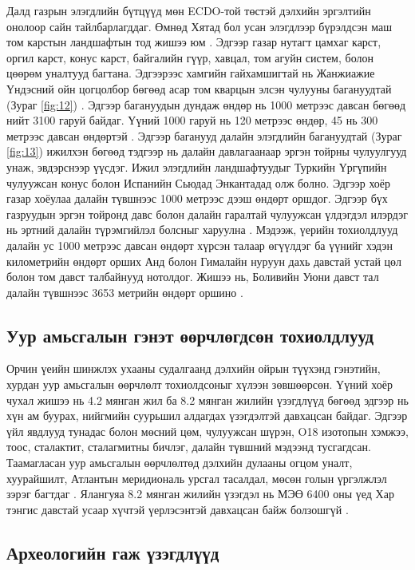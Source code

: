 \documentclass[10pt,twocolumn,letterpaper]{article}
\begin{document}
Далд газрын элэгдлийн бүтцүүд мөн ECDO-той төстэй дэлхийн эргэлтийн онолоор сайн тайлбарлагддаг. Өмнөд Хятад бол усан элэгдлээр бүрэлдсэн маш том карстын ландшафтын тод жишээ юм \cite{82}. Эдгээр газар нутагт цамхаг карст, оргил карст, конус карст, байгалийн гүүр, хавцал, том агуйн систем, болон цөөрөм уналтууд багтана. Эдгээрээс хамгийн гайхамшигтай нь Жанжиажие Үндэсний ойн цогцолбор бөгөөд асар том кварцын элсэн чулууны багануудтай (Зураг \ref{fig:12}) \cite{84}. Эдгээр багануудын дундаж өндөр нь 1000 метрээс давсан бөгөөд нийт 3100 гаруй байдаг. Үүний 1000 гаруй нь 120 метрээс өндөр, 45 нь 300 метрээс давсан өндөртэй \cite{85}. Эдгээр баганууд далайн элэгдлийн багануудтай (Зураг \ref{fig:13}) ижилхэн бөгөөд тэдгээр нь далайн давлагаанаар эргэн тойрны чулуулгууд унаж, эвдэрснээр үүсдэг. Ижил элэгдлийн ландшафтуудыг Туркийн Үргүпийн чулуужсан конус болон Испанийн Сьюдад Энкантадад олж болно. Эдгээр хоёр газар хоёулаа далайн түвшнээс 1000 метрээс дээш өндөрт оршдог. Эдгээр бүх газруудын эргэн тойронд давс болон далайн гаралтай чулуужсан үлдэгдэл илэрдэг нь эртний далайн түрэмгийлэл болсныг харуулна \cite{15,86,87}. Мэдээж, үерийн тохиолдлууд \cite{3} далайн ус 1000 метрээс давсан өндөрт хүрсэн талаар өгүүлдэг ба үүнийг хэдэн километрийн өндөрт орших Анд болон Гималайн нуруун дахь давстай устай цөл болон том давст талбайнууд нотолдог. Жишээ нь, Боливийн Уюни давст тал далайн түвшнээс 3653 метрийн өндөрт оршино \cite{94}.

\subsection{Уур амьсгалын гэнэт өөрчлөгдсөн тохиолдлууд}

Орчин үеийн шинжлэх ухааны судалгаанд дэлхийн ойрын түүхэнд гэнэтийн, хурдан уур амьсгалын өөрчлөлт тохиолдсоныг хүлээн зөвшөөрсөн. Үүний хоёр чухал жишээ нь 4.2 мянган жил ба 8.2 мянган жилийн үзэгдлүүд бөгөөд эдгээр нь хүн ам буурах, нийгмийн суурьшил алдагдах үзэгдэлтэй давхацсан байдаг. Эдгээр үйл явдлууд тунадас болон мөсний цөм, чулуужсан шүрэн, O18 изотопын хэмжээ, тоос, сталактит, сталагмитны бичлэг, далайн түвшний мэдээнд тусгагдсан. Таамагласан уур амьсгалын өөрчлөлтөд дэлхийн дулааны огцом уналт, хуурайшилт, Атлантын меридиональ урсгал тасалдал, мөсөн голын үргэлжлэл зэрэг багтдаг \cite{90,91,92}. Ялангуяа 8.2 мянган жилийн үзэгдэл нь МЭӨ 6400 оны үед Хар тэнгис давстай усаар хүчтэй үерлэсэнтэй давхацсан байж болзошгүй \cite{93}.

\subsection{Археологийн гаж үзэгдлүүд}
\end{document}
